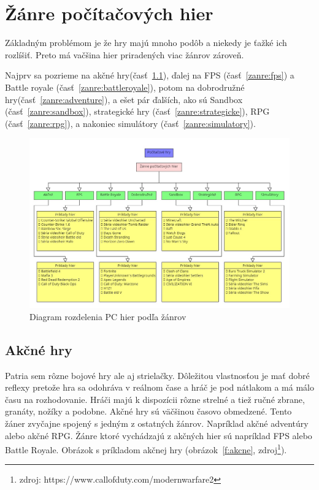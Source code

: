\documentclass[10pt,oneside,slovak,a4paper]{article}
\begin{document}
\section{Žánre počítačových hier} \label{zanre}

Základným problémom je že hry majú mnoho podôb a niekedy je ťažké ich rozlíšiť. Preto má vačšina hier priradených viac žánrov zároveň.

Najprv sa pozrieme na akčné hry(časť~\ref{zanre:akcne}), ďalej na FPS (časť~\ref{zanre:fps}) a Battle royale (časť~\ref{zanre:battleroyale}), potom na dobrodružné hry(časť~\ref{zanre:adventure}), a ešet pár ďalších, ako sú Sandbox (časť~\ref{zanre:sandbox}), strategické hry (časť~\ref{zanre:strategicke}), RPG (časť~\ref{zanre:rpg}), a nakoniec simulátory (časť~\ref{zanre:simulatory}).

\begin{figure}[h]
\centering
\includegraphics[scale=0.4]{Screenshot_4.jpg}
\caption{Diagram rozdelenia PC hier podľa žánrov}
\label{f:rpg}
\end{figure}


\subsection{Akčné hry} \label{zanre:akcne}

Patria sem rôzne bojové hry ale aj strielačky. Dôležitou vlastnosťou je mať dobré reflexy pretože hra sa odohráva v reálnom čase a hráč je pod nátlakom a má málo času na rozhodovanie. Hráči majú k dispozícii rôzne strelné a tiež ručné zbrane, granáty, nožíky a podobne. Akčné hry sú väčšinou časovo obmedzené. Tento žáner zvyčajne spojený s jedným z ostatných žánrov. Napríklad akčné adventúry alebo akčné RPG. Žánre ktoré vychádzajú z akčných hier sú napríklad FPS alebo Battle Royale. Obrázok s príkladom akčnej hry (obrázok~\ref{f:akcne}, zdroj\footnote{zdroj: https://www.callofduty.com/modernwarfare2}).
\end{document}
